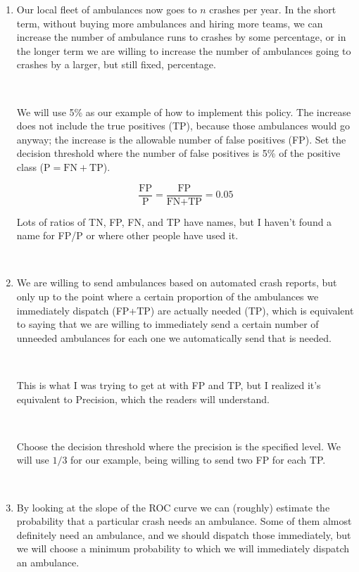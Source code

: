 \begin{enumerate}
	\item Our local fleet of ambulances now goes to $n$ crashes per year.  In the short term, without buying more ambulances and hiring more teams, we can increase the number of ambulance runs to crashes by some percentage, or in the longer term we are willing to increase the number of ambulances going to crashes by a larger, but still fixed, percentage.  
	
	\
	
	We will use 5\% as our example of how to implement this policy.  The increase does not include the true positives (TP), because those ambulances would go anyway; the increase is the allowable number of false positives (FP).  Set the decision threshold where the number of false positives is 5\% of the positive class ($\text{P} = \text{FN} + \text{TP}$).   

$$\frac{\text{FP}}{\text{P}} =  \frac{\text{FP}}{\text{FN} + \text{TP}} = 0.05  $$

Lots of ratios of TN, FP, FN, and TP have names, but I haven't found a name for FP/P or where other people have used it.  

\

	
	\item We are willing to send ambulances based on automated crash reports, but only up to the point where a certain proportion of the ambulances we immediately dispatch (FP+TP) are actually needed (TP), which is equivalent to saying that we are willing to immediately send a certain number of unneeded ambulances for each one we automatically send that is needed.  
	
	\
	
	This is what I was trying to get at with FP and TP, but I realized it's equivalent to Precision, which the readers will understand.  
	
	\
	
	Choose the decision threshold where the precision is the specified level.  We will use $1/3$ for our example, being willing to send two FP for each TP.  
	
	\
	
	\item By looking at the slope of the ROC curve we can (roughly) estimate the probability that a particular crash needs an ambulance.  Some of them almost definitely need an ambulance, and we should dispatch those immediately, but we will choose a minimum probability to which we will immediately dispatch an ambulance.  
	

\end{enumerate}
